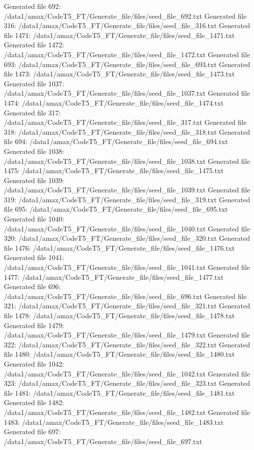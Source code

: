 Generated file 692: /data1/amax/CodeT5_FT/Generate_file/files/seed_file_692.txt
Generated file 316: /data1/amax/CodeT5_FT/Generate_file/files/seed_file_316.txt
Generated file 1471: /data1/amax/CodeT5_FT/Generate_file/files/seed_file_1471.txt
Generated file 1472: /data1/amax/CodeT5_FT/Generate_file/files/seed_file_1472.txt
Generated file 693: /data1/amax/CodeT5_FT/Generate_file/files/seed_file_693.txt
Generated file 1473: /data1/amax/CodeT5_FT/Generate_file/files/seed_file_1473.txt
Generated file 1037: /data1/amax/CodeT5_FT/Generate_file/files/seed_file_1037.txt
Generated file 1474: /data1/amax/CodeT5_FT/Generate_file/files/seed_file_1474.txt
Generated file 317: /data1/amax/CodeT5_FT/Generate_file/files/seed_file_317.txt
Generated file 318: /data1/amax/CodeT5_FT/Generate_file/files/seed_file_318.txt
Generated file 694: /data1/amax/CodeT5_FT/Generate_file/files/seed_file_694.txt
Generated file 1038: /data1/amax/CodeT5_FT/Generate_file/files/seed_file_1038.txt
Generated file 1475: /data1/amax/CodeT5_FT/Generate_file/files/seed_file_1475.txt
Generated file 1039: /data1/amax/CodeT5_FT/Generate_file/files/seed_file_1039.txt
Generated file 319: /data1/amax/CodeT5_FT/Generate_file/files/seed_file_319.txt
Generated file 695: /data1/amax/CodeT5_FT/Generate_file/files/seed_file_695.txt
Generated file 1040: /data1/amax/CodeT5_FT/Generate_file/files/seed_file_1040.txt
Generated file 320: /data1/amax/CodeT5_FT/Generate_file/files/seed_file_320.txt
Generated file 1476: /data1/amax/CodeT5_FT/Generate_file/files/seed_file_1476.txt
Generated file 1041: /data1/amax/CodeT5_FT/Generate_file/files/seed_file_1041.txt
Generated file 1477: /data1/amax/CodeT5_FT/Generate_file/files/seed_file_1477.txt
Generated file 696: /data1/amax/CodeT5_FT/Generate_file/files/seed_file_696.txt
Generated file 321: /data1/amax/CodeT5_FT/Generate_file/files/seed_file_321.txt
Generated file 1478: /data1/amax/CodeT5_FT/Generate_file/files/seed_file_1478.txt
Generated file 1479: /data1/amax/CodeT5_FT/Generate_file/files/seed_file_1479.txt
Generated file 322: /data1/amax/CodeT5_FT/Generate_file/files/seed_file_322.txt
Generated file 1480: /data1/amax/CodeT5_FT/Generate_file/files/seed_file_1480.txt
Generated file 1042: /data1/amax/CodeT5_FT/Generate_file/files/seed_file_1042.txt
Generated file 323: /data1/amax/CodeT5_FT/Generate_file/files/seed_file_323.txt
Generated file 1481: /data1/amax/CodeT5_FT/Generate_file/files/seed_file_1481.txt
Generated file 1482: /data1/amax/CodeT5_FT/Generate_file/files/seed_file_1482.txt
Generated file 1483: /data1/amax/CodeT5_FT/Generate_file/files/seed_file_1483.txt
Generated file 697: /data1/amax/CodeT5_FT/Generate_file/files/seed_file_697.txt
